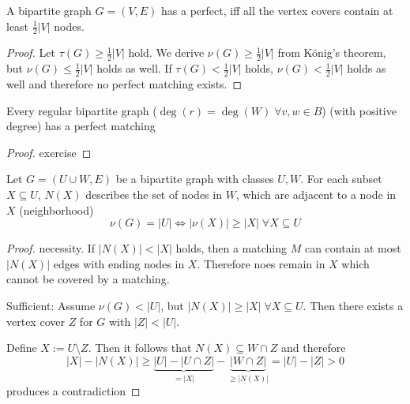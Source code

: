 \begin{lec}[2011-11-07]\end{lec}


\begin{cor}
	A bipartite graph $G=(V,E)$ has a perfect, iff all the vertex covers contain at least $\frac{1}{2} |V|$ nodes.
\end{cor}

\begin{proof}
	Let $\tau(G) \geq \frac{1}{2} |V|$ hold. We derive $\nu(G) \geq \frac{1}{2} |V|$ from König's theorem, but $\nu(G) \leq \frac{1}{2} |V|$ holds as well. If $\tau(G) < \frac{1}{2} |V|$ holds, $\nu(G) < \frac{1}{2} |V|$ holds as well and therefore no perfect matching exists.
\end{proof}

\begin{cor}
	Every regular bipartite graph ($\deg(r) = \deg(W) \; \forall v,w \in B$) (with positive degree) has a perfect matching
\end{cor}

\begin{proof}
	exercise
\end{proof}

\begin{thm}
	Let $G =( U \cup W, E)$ be a bipartite graph with classes $U, W$. For each subset $X \subseteq U$, $N(X)$ describes the set of nodes in $W$, which are adjacent to a node in $X$ (neighborhood)
	\[
		\nu(G) = |U| \Leftrightarrow | \nu(X)| \geq |X| \; \forall X \subseteq U
	\]
\end{thm}

\begin{proof}
	necessity. If $|N(X)| < |X|$ holds, then a matching $M$ can contain at most 
	$| N(X)|$ edges with ending nodes in $X$. Therefore noes remain in $X$ which 
	cannot be covered by a matching.
	
	Sufficient: Assume $\nu(G)<|U|$, but $|N(X)| \geq |X| \; \forall X \subseteq U$.
	Then there exists a vertex cover $Z$ for $G$ with $|Z| < |U|$.
	
	Define $X:=U \setminus Z$. Then it follows that $N(X) \subseteq W \cap Z$ and 
	therefore \[
		|X| - |N(X)| \geq \underbrace{|U| - |U \cap Z|}_{=|X|} - \underbrace{| W \cap Z |}_{\geq |N(X)|} = |U| - |Z| > 0
	\]
	produces a contradiction
\end{proof}


